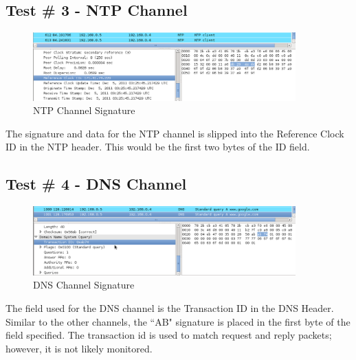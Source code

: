 \documentclass[titlepage]{article}
\begin{document}
\clearpage

\subsection{Test \# 3 - NTP Channel}

\begin{figure}[htb]                                                                       
  \begin{center}
    \includegraphics[width=0.9\textwidth]{Pictures/NTP_SIG.png}
  \end{center}
  \caption{NTP Channel Signature}
  \label{fig:ntp_sig}
\end{figure}

The signature and data for the NTP channel is slipped into the Reference Clock ID in the NTP header.
This would be the first two bytes of the ID field.  

\subsection{Test \# 4 - DNS Channel}

\begin{figure}[htb]                                                                       
  \begin{center}
    \includegraphics[width=0.9\textwidth]{Pictures/DNS_SIG.png}
  \end{center}
  \caption{DNS Channel Signature}
  \label{fig:dns_sig}
\end{figure}

The field used for the DNS channel is the Transaction ID in the DNS Header.  Similar to the other channels,
the ``AB" signature is placed in the first byte of the field specified.  The transaction id is used to 
match request and reply packets; however, it is not likely monitored.\\
\end{document}
